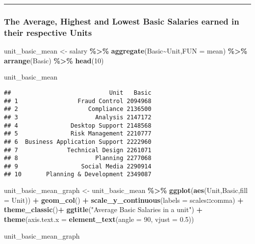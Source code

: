 \documentclass[
]{article}
\newenvironment{Shaded}{\begin{snugshade}}{\end{snugshade}}
\newcommand{\AttributeTok}[1]{\textcolor[rgb]{0.13,0.29,0.53}{#1}}
\newcommand{\DecValTok}[1]{\textcolor[rgb]{0.00,0.00,0.81}{#1}}
\newcommand{\FloatTok}[1]{\textcolor[rgb]{0.00,0.00,0.81}{#1}}
\newcommand{\FunctionTok}[1]{\textcolor[rgb]{0.13,0.29,0.53}{\textbf{#1}}}
\newcommand{\NormalTok}[1]{#1}
\newcommand{\OtherTok}[1]{\textcolor[rgb]{0.56,0.35,0.01}{#1}}
\newcommand{\SpecialCharTok}[1]{\textcolor[rgb]{0.81,0.36,0.00}{\textbf{#1}}}
\newcommand{\StringTok}[1]{\textcolor[rgb]{0.31,0.60,0.02}{#1}}
\begin{document}
\begin{center}\rule{0.5\linewidth}{0.5pt}\end{center}

\subsubsection{The Average, Highest and Lowest Basic Salaries earned in
their respective
Units}\label{the-average-highest-and-lowest-basic-salaries-earned-in-their-respective-units}

\begin{Shaded}
\begin{Highlighting}[]
\NormalTok{unit\_basic\_mean }\OtherTok{\textless{}{-}}\NormalTok{ salary }\SpecialCharTok{\%\textgreater{}\%} 
  \FunctionTok{aggregate}\NormalTok{(Basic}\SpecialCharTok{\textasciitilde{}}\NormalTok{Unit,}\AttributeTok{FUN =}\NormalTok{ mean) }\SpecialCharTok{\%\textgreater{}\%}
  \FunctionTok{arrange}\NormalTok{(Basic) }\SpecialCharTok{\%\textgreater{}\%}
  \FunctionTok{head}\NormalTok{(}\DecValTok{10}\NormalTok{)}


\NormalTok{unit\_basic\_mean}
\end{Highlighting}
\end{Shaded}

\begin{verbatim}
##                            Unit   Basic
## 1                 Fraud Control 2094968
## 2                    Compliance 2136500
## 3                      Analysis 2147172
## 4               Desktop Support 2148568
## 5               Risk Management 2210777
## 6  Business Application Support 2222960
## 7              Technical Design 2261071
## 8                      Planning 2277068
## 9                  Social Media 2290914
## 10       Planning & Development 2349087
\end{verbatim}

\begin{Shaded}
\begin{Highlighting}[]
\NormalTok{unit\_basic\_mean\_graph }\OtherTok{\textless{}{-}}\NormalTok{ unit\_basic\_mean }\SpecialCharTok{\%\textgreater{}\%} 
  \FunctionTok{ggplot}\NormalTok{(}\FunctionTok{aes}\NormalTok{(Unit,Basic,}\AttributeTok{fill =}\NormalTok{ Unit)) }\SpecialCharTok{+} 
  \FunctionTok{geom\_col}\NormalTok{() }\SpecialCharTok{+} 
  \FunctionTok{scale\_y\_continuous}\NormalTok{(}\AttributeTok{labels =}\NormalTok{ scales}\SpecialCharTok{::}\NormalTok{comma)  }\SpecialCharTok{+} 
  \FunctionTok{theme\_classic}\NormalTok{()}\SpecialCharTok{+} 
  \FunctionTok{ggtitle}\NormalTok{(}\StringTok{"Average Basic Salaries in a unit"}\NormalTok{) }\SpecialCharTok{+} 
  \FunctionTok{theme}\NormalTok{(}\AttributeTok{axis.text.x =} \FunctionTok{element\_text}\NormalTok{(}\AttributeTok{angle =} \DecValTok{90}\NormalTok{, }\AttributeTok{vjust =} \FloatTok{0.5}\NormalTok{))}



\NormalTok{unit\_basic\_mean\_graph}
\end{Highlighting}
\end{Shaded}
\end{document}
